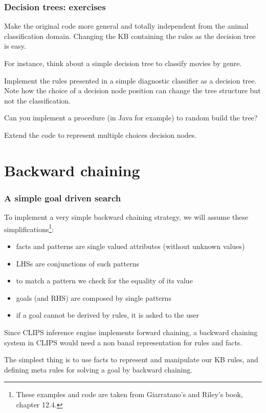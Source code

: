 \documentclass[xcolor={usenames,dvipsnames,svgnames}, compress]{beamer}
\begin{document}
\begin{frame}
  \frametitle{Decision trees: exercises}
Make the original code more general and totally independent from the
animal classification domain. Changing the KB containing the rules as
the decision tree is easy.\par
For instance, think about a simple decision tree to classify movies by
genre.\par\bigskip

Implement the rules presented in a simple diagnostic classifier as a
decision tree. Note how the choice of a decision node position can
change the tree structure but not the classification.\par
Can you implement a procedure (in Java for example) to
random build the tree?\par\bigskip

Extend the code to represent multiple choices decision
nodes.\par\bigskip

\end{frame}

\section{Backward chaining}
{
  \begin{frame}
    \sectionpage
  \end{frame}
}

\begin{frame}
  \frametitle{A simple goal driven search}

  To implement a very simple backward chaining strategy, we will
  assume these simplifications\footnote{These examples and code are taken from
    Giarratano's and Riley's book, chapter 12.4.}:
  \begin{itemize}
  \item facts and patterns are single valued attributes (without unknown values)
  \item LHSs are conjunctions of such patterns
  \item to match a pattern we check for the equality of its value
  \item goals (and RHS) are composed by  single patterns
  \item if a goal cannot be derived by rules, it is asked to the user
  \end{itemize}\bigskip
  
  Since CLIPS inference engine implements forward chaining, a backward
  chaining system in CLIPS would need a non banal representation for
  rules and facts.\par
  The simplest thing is to use facts to represent and manipulate our
  KB rules, and defining meta rules for solving a goal by backward chaining.
\end{frame}
\end{document}
